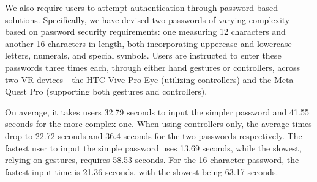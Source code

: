 \documentclass[sigconf]{acmart}
\begin{document}
We also require users to attempt authentication through password-based solutions. Specifically, we have devised two passwords of varying complexity based on password security requirements: one measuring 12 characters and another 16 characters in length, both incorporating uppercase and lowercase letters, numerals, and special symbols. Users are instructed to enter these passwords three times each, through either hand gestures or controllers, across two VR devices—the HTC Vive Pro Eye (utilizing controllers) and the Meta Quest Pro (supporting both gestures and controllers).

On average, it takes users 32.79 seconds to input the simpler password and 41.55 seconds for the more complex one. When using controllers only, the average times drop to 22.72 seconds and 36.4 seconds for the two passwords respectively. The fastest user to input the simple password uses 13.69 seconds, while the slowest, relying on gestures, requires 58.53 seconds. For the 16-character password, the fastest input time is 21.36 seconds, with the slowest being 63.17 seconds.
\end{document}
